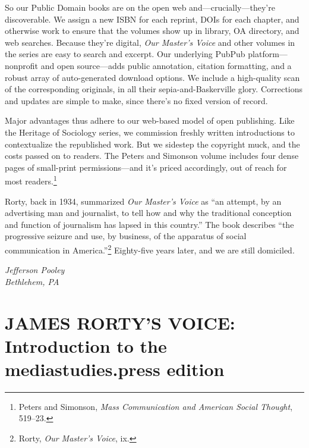 \documentclass[twoside,nohyper,openany,nobib]{tufte-book}
\let\oldchapter\chapter
\def\chapter{%
  \setcounter{footnote}{0}%
  \oldchapter
}
\begin{document}
So our Public Domain books are on the open web and---crucially---they're
discoverable. We assign a new ISBN for each reprint, DOIs for each
chapter, and otherwise work to ensure that the volumes show up in
library, OA directory, and web searches. Because they're digital,
\emph{Our Master's Voice} and other volumes in the series are easy to
search and excerpt. Our underlying PubPub platform---nonprofit and open
source---adds public annotation, citation formatting, and a robust array
of auto-generated download options. We include a high-quality scan of
the corresponding originals, in all their sepia-and-Baskerville glory.
Corrections and updates are simple to make, since there's no fixed
version of record.

Major advantages thus adhere to our web-based model of open publishing.
Like the Heritage of Sociology series, we commission freshly written
introductions to contextualize the republished work. But we sidestep the
copyright muck, and the costs passed on to readers. The Peters and
Simonson volume includes four dense pages of small-print
permissions---and it's priced accordingly, out of reach for most
readers.\footnote{Peters and Simonson, \emph{Mass Communication and American Social
  Thought}, 519--23.}

Rorty, back in 1934, summarized \emph{Our Master's Voice} as ``an
attempt, by an advertising man and journalist, to tell how and why the
traditional conception and function of journalism has lapsed in this
country.'' The book describes ``the progressive seizure and use, by
business, of the apparatus of social communication in America.''\footnote{Rorty, \emph{Our Master's Voice}, ix.}
Eighty-five years later, and we are still domiciled.

\begin{flushright}\emph{Jefferson Pooley}\\ \emph{Bethlehem, PA}\end{flushright}




\chapter[JAMES RORTY'S VOICE: Introduction to the mediastudies.press edition]{JAMES RORTY'S VOICE: Introduction to the\\ mediastudies.press edition}
\label{ch:introduction-msp}

\emph{}
\end{document}
